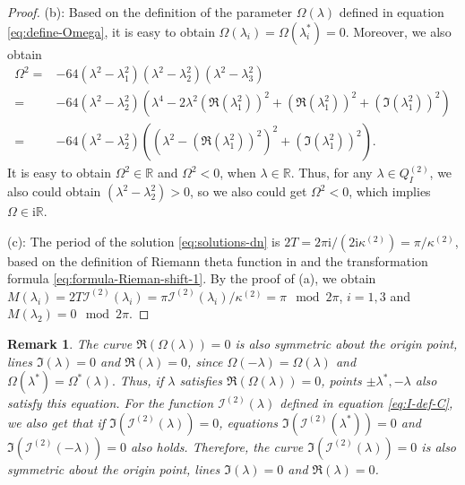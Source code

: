 \documentclass[11pt,reqno]{amsart}
\newcommand{\ii}{\mathrm{i}}
\newtheorem{remark}{Remark}
\numberwithin{equation}{section}
\begin{document}
\begin{proof}
	(b): Based on the definition of the parameter $\Omega(\lambda)$ defined in equation \eqref{eq:define-Omega}, it is easy to obtain $\Omega(\lambda_i)=\Omega(\lambda_i^*)=0$.
	Moreover, we also obtain
	\begin{equation}\nonumber
		\begin{split}
			\Omega^2
			=&-64 \left(\lambda^2-\lambda_1^2\right)\left(\lambda^2-\lambda_2^2\right)\left(\lambda^2-\lambda_3^2\right)\\
			=&-64\left(\lambda^2-\lambda_2^2\right) \left(\lambda^4-2\lambda^2\left(\Re(\lambda_1^2)\right)^2+\left(\Re(\lambda_1^2)\right)^2+\left(\Im(\lambda_1^2)\right)^2\right)\\
			=&-64\left(\lambda^2-\lambda_2^2\right) \left(\left(\lambda^2-\left(\Re(\lambda_1^2)\right)^2\right)^2+\left(\Im(\lambda_1^2)\right)^2\right).
		\end{split}
	\end{equation}
	It is easy to obtain $\Omega^2\in \mathbb{R}$ and $\Omega^2<0$, when $\lambda \in \mathbb{R}$.
	Thus, for any $\lambda \in  Q^{(2)} _{I}$, we also could obtain $\left(\lambda^2-\lambda_2^2\right)>0$, so we also could get $\Omega^2<0$, which implies $\Omega\in \ii \mathbb{R}$.
	
	(c): The period of the solution \eqref{eq:solutions-dn} is $2T=2\pi\ii/(2\ii \kappa^{(2)})=\pi/\kappa^{(2)}$, based on the 
	definition of Riemann theta function in  and the transformation formula \eqref{eq:formula-Rieman-shift-1}.
	 By the proof of (a), we obtain $M(\lambda_i)=2T\mathcal{I}^{(2)}(\lambda_i)=\pi\mathcal{I}^{(2)}(\lambda_i)/\kappa^{(2)}=\pi \mod 2\pi $, $i=1,3$ and $M(\lambda_2)=0 \mod 2\pi $.
\end{proof}

\begin{remark}\label{remark:Omega-sym}
	The curve ${\Re}(\Omega(\lambda))=0$ is also symmetric about the origin point, lines ${\Im}(\lambda)=0$ and ${\Re}(\lambda)=0$, since $\Omega(-\lambda)=\Omega(\lambda)$ and $\Omega(\lambda^*)=\Omega^*(\lambda).$
	Thus, if $\lambda$ satisfies ${\Re}(\Omega(\lambda))=0$, points $\pm\lambda^*,-\lambda$ also satisfy this equation. 
	For the function $\mathcal{I}^{(2)}(\lambda)$ defined in equation \eqref{eq:I-def-C}, we also get that 
	if $\Im(\mathcal{I}^{(2)}(\lambda))=0$, equations $\Im(\mathcal{I}^{(2)}(\lambda^{*}))=0$ and $\Im(\mathcal{I}^{(2)}(-\lambda))=0$ also holds.
	Therefore,
	the curve $\Im(\mathcal{I}^{(2)}(\lambda))=0$ is also symmetric about the origin point, lines ${\Im}(\lambda)=0$ and ${\Re}(\lambda)=0$.
\end{remark}
\end{document}
